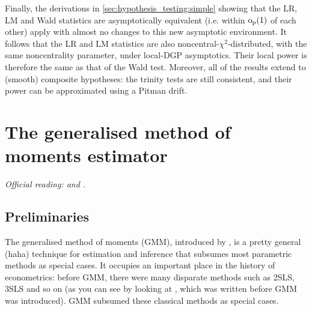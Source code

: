 \documentclass[11pt,letterpaper,reqno,oneside]{article}
\begin{document}
Finally, the derivations in \cref{sec:hypothesis_testing:simple} showing that the LR, LM and Wald statistics are asymptotically equivalent (i.e. within $\mathrm{o}_{\mathrm{p}}(1)$ of each other) apply with almost no changes to this new asymptotic environment. It follows that the LR and LM statistics are also noncentral-$\chi^2$-distributed, with the same noncentrality parameter, under local-DGP asymptotics. Their local power is therefore the same as that of the Wald test. Moreover, all of the results extend to (smooth) composite hypotheses: the trinity tests are still consistent, and their power can be approximated using a Pitman drift.



\pagebreak
\section{The generalised method of moments estimator}
\label{sec:GMM}

\emph{%
Official reading: \textcite[][sec. 8.1.1 and 8.2.2]{Amemiya1985} and \textcite[][sec. 2.2.3, 2.5, 3.3 and 4.3]{NeweyMcfadden1994}.}



\subsection{Preliminaries}
\label{sec:GMM:preliminaries}

The generalised method of moments (GMM), introduced by \textcite{Hansen1982}, is a pretty general (haha) technique for estimation and inference that subsumes most parametric methods as special cases. It occupies an important place in the history of econometrics: before GMM, there were many disparate methods such as 2SLS, 3SLS and so on (as you can see by looking at \textcite{Amemiya1985}, which was written before GMM was introduced). GMM subsumed these classical methods as special cases.
\end{document}
